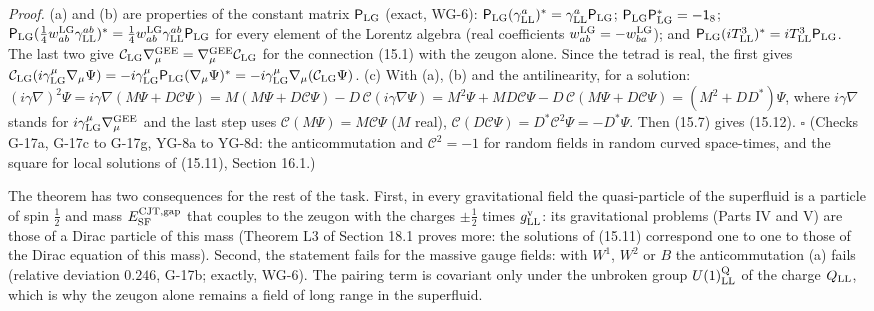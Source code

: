 \documentclass[
  10pt,
]{article}
\begin{document}
\emph{Proof.} (a) and (b) are properties of the constant matrix
\(\mathsf P_{\rm LG}\) (exact, WG-6):
\(\mathsf P_{\rm LG}(\gamma^a_{\rm LL})^*=\gamma^a_{\rm LL}\mathsf P_{\rm LG}\);
\(\mathsf P_{\rm LG}\mathsf P_{\rm LG}^*=-\mathsf 1_8\);
\(\mathsf P_{\rm LG}(\tfrac14w^{\rm LG}_{ab}\gamma^{ab}_{\rm LL})^*=\tfrac14w^{\rm LG}_{ab}\gamma^{ab}_{\rm LL}\mathsf P_{\rm LG}\)
for every element of the Lorentz algebra (real coefficients
\(w^{\rm LG}_{ab}=-w^{\rm LG}_{ba}\)); and
\(\mathsf P_{\rm LG}(iT^3_{\rm LL})^*=iT^3_{\rm LL}\mathsf P_{\rm LG}\).
The last two give
\(\mathcal C_{\rm LG}\nabla^{\rm GEE}_\mu=\nabla^{\rm GEE}_\mu\mathcal C_{\rm LG}\)
for the connection (15.1) with the zeugon alone. Since the tetrad is
real, the first gives
\(\mathcal C_{\rm LG}(i\gamma^\mu_{\rm LG}\nabla_\mu\Psi)=-i\gamma^\mu_{\rm LG}\mathsf P_{\rm LG}(\nabla_\mu\Psi)^*=-i\gamma^\mu_{\rm LG}\nabla_\mu(\mathcal C_{\rm LG}\Psi)\).
(c) With (a), (b) and the antilinearity, for a solution:
\((i\gamma\nabla)^2\Psi=i\gamma\nabla(M\Psi+D\mathcal C\Psi)=M(M\Psi+D\mathcal C\Psi)-D\,\mathcal C(i\gamma\nabla\Psi)=M^2\Psi+MD\mathcal C\Psi-D\,\mathcal C(M\Psi+D\mathcal C\Psi)=(M^2+DD^*)\Psi\),
where \(i\gamma\nabla\) stands for
\(i\gamma^\mu_{\rm LG}\nabla^{\rm GEE}_\mu\) and the last step uses
\(\mathcal C(M\Psi)=M\mathcal C\Psi\) (\(M\) real),
\(\mathcal C(D\mathcal C\Psi)=D^*\mathcal C^2\Psi=-D^*\Psi\). Then
(15.7) gives (15.12). \(\square\) (Checks G-17a, G-17c to G-17g, YG-8a
to YG-8d: the anticommutation and \(\mathcal C^2=-1\) for random fields
in random curved space-times, and the square for local solutions of
(15.11), Section 16.1.)

The theorem has two consequences for the rest of the task. First, in
every gravitational field the quasi-particle of the superfluid is a
particle of spin \(\tfrac12\) and mass \(E^{\rm CJT,gap}_{\rm SF}\) that
couples to the zeugon with the charges \(\pm\tfrac12\) times
\(g^{\rm v}_{\rm LL}\): its gravitational problems (Parts IV and V) are
those of a Dirac particle of this mass (Theorem L3 of Section 18.1
proves more: the solutions of (15.11) correspond one to one to those of
the Dirac equation of this mass). Second, the statement fails for the
massive gauge fields: with \(W^1\), \(W^2\) or \(B\) the anticommutation
(a) fails (relative deviation \(0.246\), G-17b; exactly, WG-6). The
pairing term is covariant only under the unbroken group
\(U(1)^{\rm Q}_{\rm LL}\) of the charge \(Q_{\rm LL}\), which is why the
zeugon alone remains a field of long range in the superfluid.
\end{document}
